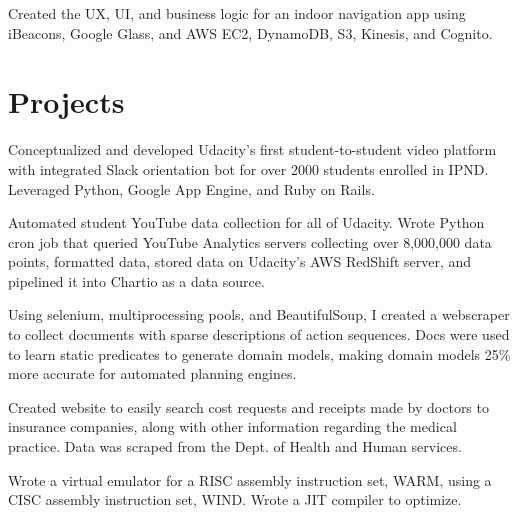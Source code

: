 \documentclass[]{deedy-resume-openfont}
\begin{document}
\begin{minipage}[t]{0.66\textwidth}
\begin{tightemize}
\item Created the UX, UI, and business logic for an indoor navigation app using iBeacons, Google Glass, and AWS EC2, DynamoDB, S3, Kinesis, and Cognito.
\end{tightemize}
\sectionsep


\section{Projects}

\begin{tightemize}
\item Conceptualized and developed Udacity's first student-to-student video platform with integrated Slack orientation bot for over 2000 students enrolled in IPND. Leveraged Python, Google App Engine, and Ruby on Rails.
\end{tightemize}
\sectionsep

\begin{tightemize}
\item Automated student YouTube data collection for all of Udacity. Wrote Python cron job that queried YouTube Analytics servers collecting over 8,000,000 data points, formatted data, stored data on Udacity's AWS RedShift server, and pipelined it into Chartio as a data source.
\end{tightemize}
\sectionsep

\begin{tightemize}
\item Using selenium, multiprocessing pools, and BeautifulSoup, I created a webscraper to collect documents with sparse descriptions of action sequences. Docs were used to learn static predicates to generate domain models, making domain models 25\% more accurate for automated planning engines.
\end{tightemize}
\sectionsep

\begin{tightemize}
\item Created website to easily search cost requests and receipts made by doctors to insurance companies, along with other information regarding the medical practice. Data was scraped from the Dept. of Health and Human services.
\end{tightemize}
\sectionsep

\begin{tightemize}
\item Wrote a virtual emulator for a RISC assembly instruction set, WARM, using a CISC assembly instruction set, WIND. Wrote a JIT compiler to optimize.
\end{tightemize}


\end{minipage} 
\end{document}

